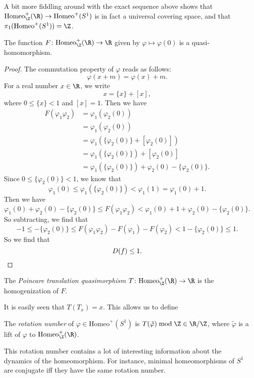 \documentclass[a4paper]{article}
\newcommand\Homeo{\mathrm{Homeo}}
\begin{document}
A bit more fiddling around with the exact sequence above shows that $\Homeo^+_{\Z}(\R) \to \Homeo^+(S^1)$ is in fact a universal covering space, and that $\pi_1(\Homeo^+(S^1)) = \Z$.

\begin{lemma}
  The function $F\colon \Homeo_\Z^+(\R) \to \R$ given by $\varphi \mapsto \varphi(0)$ is a quasi-homomorphism.
\end{lemma}

\begin{proof}
  The commutation property of $\varphi$ reads as follows:
  \[
    \varphi(x + m) = \varphi(x) + m.
  \]
  For a real number $x \in \R$, we write
  \[
    x = \{x \} + [x],
  \]
  where $0 \leq \{x\} < 1$ and $[x] = 1$. Then we have
  \begin{align*}
    F(\varphi_1 \varphi_2) &= \varphi_1(\varphi_2(0)) \\
    &= \varphi_1(\varphi_2(0))\\
    &= \varphi_1(\{\varphi_2(0)\} + [\varphi_2(0)])\\
    &= \varphi_1(\{\varphi_2(0)\}) + [\varphi_2(0)]\\
    &= \varphi_1(\{\varphi_2(0)\}) + \varphi_2(0) - \{\varphi_2(0)\}.
  \end{align*}
  Since $0 \leq \{\varphi_2(0)\} < 1$, we know that
  \[
    \varphi_1(0) \leq \varphi_1(\{\varphi_2(0)\}) < \varphi_1(1) = \varphi_1(0) + 1.
  \]
  Then we have
  \[
    \varphi_1(0) + \varphi_2(0) - \{\varphi_2(0)\} \leq F(\varphi_1\varphi_2) < \varphi_1(0) + 1 + \varphi_2(0) - \{\varphi_2(0)\}.
  \]
  So subtracting, we find that
  \[
    -1 \leq - \{\varphi_2(0)\} \leq F(\varphi_1 \varphi_2) - F(\varphi_1) - F(\varphi_2) < 1 - \{\varphi_2(0) \} \leq 1.
  \]
  So we find that
  \[
    D(f) \leq 1.\qedhere
  \]
\end{proof}

\begin{defi}
  The \emph{Poincare translation quasimorphism} $T\colon \Homeo_\Z^+ (\R) \to \R$ is the homogenization of $F$.
\end{defi}

It is easily seen that $T(T_x) = x$. This allows us to define

\begin{defi}
  The \emph{rotation number}  of $\varphi \in \Homeo^+(S^1)$ is $T(\tilde{\varphi}) \bmod \Z \in \R/\Z$, where $\tilde{\varphi}$ is a lift of $\varphi$ to $\Homeo_\Z^+(\R)$.
\end{defi}
This rotation number contains a lot of interesting information about the dynamics of the homeomorphism. For instance, minimal homeomorphisms of $S^1$ are conjugate iff they have the same rotation number.
\end{document}
